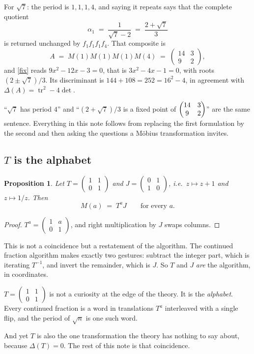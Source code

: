 \documentclass[12pt,a4paper]{article}
\theoremstyle{plain}
\newtheorem{proposition}[theorem]{Proposition}
\theoremstyle{definition}
\newcommand{\tr}{\operatorname{tr}}
\newcommand{\Mat}[4]{\begin{pmatrix} #1 & #2 \\ #3 & #4\end{pmatrix}}
\newcommand{\T}{\Mat{1}{1}{0}{1}}
\begin{document}
For $\sqrt 7$: the period is $1,1,1,4$, and saying it repeats says that the complete quotient
\[
  \alpha_1 \;=\; \frac{1}{\sqrt7-2} \;=\; \frac{2+\sqrt7}{3}
\]
is returned unchanged by $f_1f_1f_1f_4$. That composite is
\[
  A \;=\; M(1)M(1)M(1)M(4) \;=\; \Mat{14}{3}{9}{2},
\]
and \eqref{fix} reads $9x^2-12x-3=0$, that is $3x^2-4x-1=0$, with roots $(2\pm\sqrt7)/3$. Its discriminant is $144+108 = 252 = 16^2-4$, in agreement with $\Delta(A)=\tr^2-4\det$.

\begin{tcolorbox}[colback=blue!6, colframe=blue!45!black, arc=2mm]
``$\sqrt7$ has period $4$'' and ``$(2+\sqrt7)/3$ is a fixed point of $\protect\Mat{14}{3}{9}{2}$'' are the same sentence. Everything in this note follows from replacing the first formulation by the second and then asking the questions a M\"obius transformation invites.
\end{tcolorbox}

\subsection*{$T$ is the alphabet}

\begin{proposition}\label{alphabet}
Let $T = \T$ and $J = \Mat{0}{1}{1}{0}$, i.e.\ $z\mapsto z+1$ and $z \mapsto 1/z$. Then
\[
  M(a) \;=\; T^{a} J \qquad\text{for every } a .
\]
\end{proposition}

\begin{proof}
$T^a = \Mat{1}{a}{0}{1}$, and right multiplication by $J$ swaps columns.
\end{proof}

This is not a coincidence but a restatement of the algorithm. The continued fraction algorithm makes exactly two gestures: subtract the integer part, which is iterating $T^{-1}$, and invert the remainder, which is $J$. So $T$ and $J$ \emph{are} the algorithm, in coordinates.

\begin{tcolorbox}[colback=blue!6, colframe=blue!45!black, arc=2mm]
$T = \T$ is not a curiosity at the edge of the theory. It is the \emph{alphabet}. Every continued fraction is a word in translations $T^{a}$ interleaved with a single flip, and the period of $\sqrt n$ is one such word.
\end{tcolorbox}

And yet $T$ is also the one transformation the theory has nothing to say about, because $\Delta(T) = 0$. The rest of this note is that coincidence.
\end{document}
